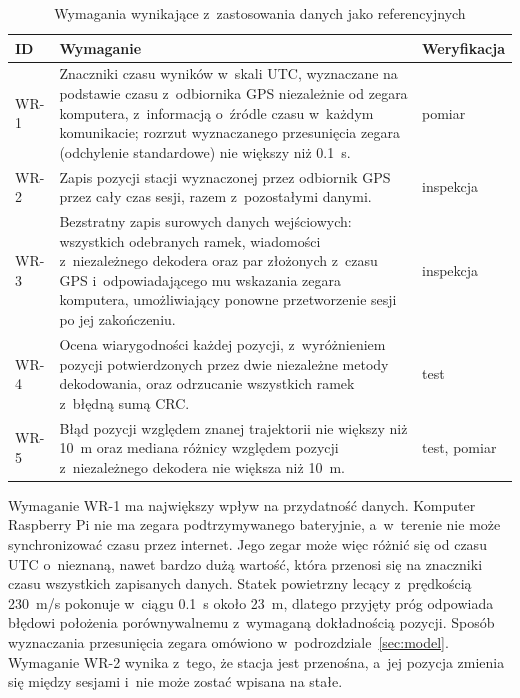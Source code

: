 \begin{table}[!htb]
  \centering
  \caption{Wymagania wynikające z~zastosowania danych jako referencyjnych}
  \label{tab:wr}
  \small
  \begin{tabular}{>{\raggedright}p{1.2cm} >{\raggedright}p{11.4cm} >{\raggedright\arraybackslash}p{1.9cm}}
    \toprule
    ID & Wymaganie & Weryfikacja \\
    \midrule
    WR-1 & Znaczniki czasu wyników w~skali UTC, wyznaczane na podstawie czasu z~odbiornika GPS niezależnie od zegara komputera, z~informacją o~źródle czasu w~każdym komunikacie; rozrzut wyznaczanego przesunięcia zegara (odchylenie standardowe) nie większy niż \SI{0.1}{s}. & pomiar \\
    WR-2 & Zapis pozycji stacji wyznaczonej przez odbiornik GPS przez cały czas sesji, razem z~pozostałymi danymi. & inspekcja \\
    WR-3 & Bezstratny zapis surowych danych wejściowych: wszystkich odebranych ramek, wiadomości z~niezależnego dekodera oraz par złożonych z~czasu GPS i~odpowiadającego mu wskazania zegara komputera, umożliwiający ponowne przetworzenie sesji po jej zakończeniu. & inspekcja \\
    WR-4 & Ocena wiarygodności każdej pozycji, z~wyróżnieniem pozycji potwierdzonych przez dwie niezależne metody dekodowania, oraz odrzucanie wszystkich ramek z~błędną sumą CRC. & test \\
    WR-5 & Błąd pozycji względem znanej trajektorii nie większy niż \SI{10}{m} oraz mediana różnicy względem pozycji z~niezależnego dekodera nie większa niż \SI{10}{m}. & test, pomiar \\
    \bottomrule
  \end{tabular}
\end{table}

Wymaganie WR-1 ma największy wpływ na przydatność danych. Komputer Raspberry Pi nie ma zegara podtrzymywanego bateryjnie, a~w~terenie nie może synchronizować czasu przez internet. Jego zegar może więc różnić się od czasu UTC o~nieznaną, nawet bardzo dużą wartość, która przenosi się na znaczniki czasu wszystkich zapisanych danych. Statek powietrzny lecący z~prędkością \SI{230}{m/s} pokonuje w~ciągu \SI{0.1}{s} około \SI{23}{m}, dlatego przyjęty próg odpowiada błędowi położenia porównywalnemu z~wymaganą dokładnością pozycji. Sposób wyznaczania przesunięcia zegara omówiono w~podrozdziale~\ref{sec:model}. Wymaganie WR-2 wynika z~tego, że stacja jest przenośna, a~jej pozycja zmienia się między sesjami i~nie może zostać wpisana na stałe.

